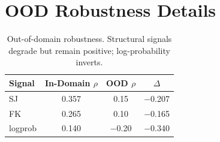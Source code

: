 \documentclass[11pt,a4paper]{article}
\begin{document}
\appendix
\section{OOD Robustness Details}
\label{app:ood}

\begin{table}[h]
\centering
\small
\caption{Out-of-domain robustness. Structural signals degrade but remain positive; log-probability inverts.}
\label{tab:ood}
\begin{tabular}{l cc c}
\toprule
Signal & In-Domain $\rho$ & OOD $\rho$ & $\Delta$ \\
\midrule
SJ      & 0.357 & 0.15  & $-$0.207 \\
FK      & 0.265 & 0.10  & $-$0.165 \\
logprob & 0.140 & $-$0.20 & $-$0.340 \\
\bottomrule
\end{tabular}
\end{table}
\end{document}

